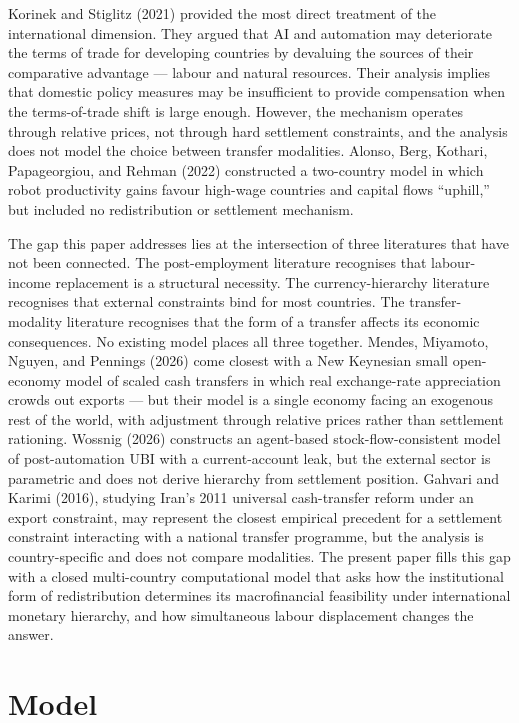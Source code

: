 \documentclass[preprint,review,12pt]{elsarticle}
\begin{document}
Korinek and Stiglitz (2021) provided the most direct treatment of the
international dimension. They argued that AI and automation may
deteriorate the terms of trade for developing countries by devaluing the
sources of their comparative advantage --- labour and natural resources.
Their analysis implies that domestic policy measures may be insufficient
to provide compensation when the terms-of-trade shift is large enough.
However, the mechanism operates through relative prices, not through
hard settlement constraints, and the analysis does not model the choice
between transfer modalities. Alonso, Berg, Kothari, Papageorgiou, and
Rehman (2022) constructed a two-country model in which robot
productivity gains favour high-wage countries and capital flows
``uphill,'' but included no redistribution or settlement mechanism.

The gap this paper addresses lies at the intersection of three
literatures that have not been connected. The post-employment literature
recognises that labour-income replacement is a structural necessity. The
currency-hierarchy literature recognises that external constraints bind
for most countries. The transfer-modality literature recognises that the
form of a transfer affects its economic consequences. No existing model
places all three together. Mendes, Miyamoto, Nguyen, and Pennings (2026)
come closest with a New Keynesian small open-economy model of scaled
cash transfers in which real exchange-rate appreciation crowds out
exports --- but their model is a single economy facing an exogenous rest
of the world, with adjustment through relative prices rather than
settlement rationing. Wossnig (2026) constructs an agent-based
stock-flow-consistent model of post-automation UBI with a
current-account leak, but the external sector is parametric and does not
derive hierarchy from settlement position. Gahvari and Karimi (2016),
studying Iran's 2011 universal cash-transfer reform under an export
constraint, may represent the closest empirical precedent for a
settlement constraint interacting with a national transfer programme,
but the analysis is country-specific and does not compare modalities.
The present paper fills this gap with a closed multi-country
computational model that asks how the institutional form of
redistribution determines its macrofinancial feasibility under
international monetary hierarchy, and how simultaneous labour
displacement changes the answer.

\section{Model}
\end{document}
